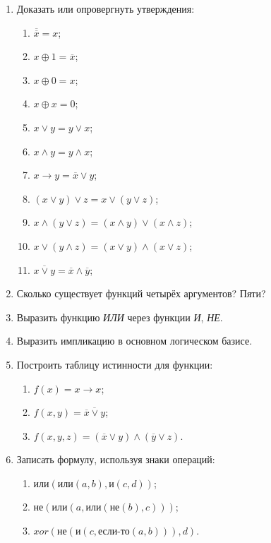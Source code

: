 \begin{enumerate}
    \item Доказать или опровергнуть утверждения:
    \begin{enumerate}
        \item $\overline{\overline{x}}=x$;
        \item $x\oplus 1=\overline{x}$;
        \item $x\oplus 0=x$;
        \item $x\oplus x=0$;
        \item $x\lor y = y\lor x$;
        \item $x\land y = y\land x$;
        \item $x\to y = \overline{x}\lor y$;
        \item $(x\lor y)\lor z = x\lor(y\lor z)$;
        \item $x\land (y\lor z) = (x\land y)\lor(x\land z)$;
        \item $x\lor (y\land z) = (x\lor y)\land(x\lor z)$;
        \item $\overline{x\lor y}=\overline{x}\land\overline{y}$;
    \end{enumerate}
    
    \item Сколько существует функций четырёх аргументов? Пяти?
    
    \item Выразить функцию \emph{ИЛИ} через функции \emph{И}, \emph{НЕ}.

    \item Выразить импликацию в основном логическом базисе.
    
    \item Построить таблицу истинности для функции:
    \begin{enumerate}
        \item $f(x)=x\to x$;
        \item $f(x,y)=\overline{\overline{x}\lor y}$;
        \item $f(x,y,z)=(\overline{x}\lor y)\land(\overline{y}\lor z)$.
    \end{enumerate}
    
    \item Записать формулу, используя знаки операций:
    \begin{enumerate}
        \item $\textit{или}(\textit{или}(a,b),\textit{и}(c,d))$;
        \item $\textit{не}(\textit{или}(a,\textit{или}(\textit{не}(b),c)))$;
        \item $\textit{xor}(\textit{не}(\textit{и}(c,\textit{если-то}(a,b))),d)$.
    \end{enumerate}
    

\end{enumerate}
